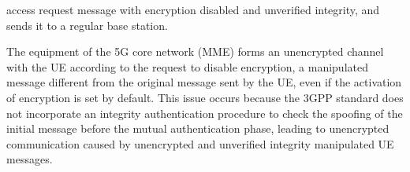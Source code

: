 \documentclass[english]{article}
\begin{document}
access request message with encryption disabled and unverified integrity, and
sends it to a regular base station.

The equipment of the 5G core network (MME) forms an unencrypted channel with
the UE according to the request to disable encryption, a manipulated message
different from the original message sent by the UE, even if the activation of
encryption is set by default. This issue occurs because the 3GPP standard does
not incorporate an integrity authentication procedure to check the spoofing of
the initial message before the mutual authentication phase, leading to
unencrypted communication caused by unencrypted and unverified integrity
manipulated UE messages.
\end{document}
